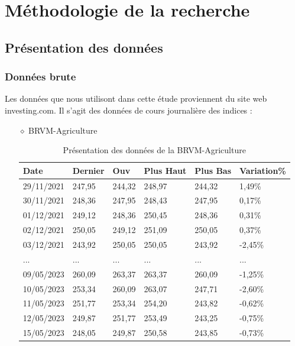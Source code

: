 \section{Méthodologie de la recherche}
\subsection{ Présentation des données }
\subsubsection{Données brute}
\par{
Les données que nous utilisont dans cette étude proviennent du site web investing.com.
Il s'agit des données de cours journalière des indices : }
\begin{itemize}
\item[$\diamond$] BRVM-Agriculture 
\begin{table}[ht]
	\centering
	\caption{Présentation des données de la BRVM-Agriculture}\label{tab:multirow}
	\begin{tabular}{p{2cm}p{2cm}p{2cm}p{2cm}p{2cm}p{2cm}}
		\hline
		Date 		& Dernier 	& Ouv 		& Plus Haut & Plus Bas 	& Variation\%	\\
		\hline                                                                  
		29/11/2021  &247,95  &244,32     &248,97   &244,32       &1,49\%    \\
		30/11/2021  &248,36  &247,95     &248,43   &247,95       &0,17\%  	\\
		01/12/2021  &249,12  &248,36     &250,45   &248,36       &0,31\%    \\
		02/12/2021  &250,05  &249,12     &251,09   &250,05       &0,37\%    \\
		03/12/2021  &243,92  &250,05     &250,05   &243,92      &-2,45\%    \\
		...            &...     &...        &...      &...         &...     \\
		09/05/2023  &260,09  &263,37     &263,37   &260,09      &-1,25\%   	\\
		10/05/2023  &253,34  &260,09     &263,07   &247,71      &-2,60\%    \\
		11/05/2023  &251,77  &253,34     &254,20   &243,82      &-0,62\%    \\
		12/05/2023  &249,87  &251,77     &253,49   &243,25      &-0,75\%   	\\
		15/05/2023  &248,05  &249,87     &250,58   &243,85      &-0,73\%  	\\
		\hline
	\end{tabular}
\end{table}%


\end{itemize}

